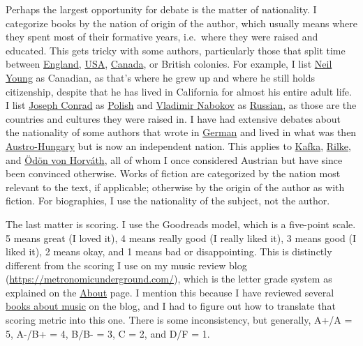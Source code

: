 \documentclass[12pt]{article}
\begin{document}
Perhaps the largest opportunity for debate is the matter of nationality. I categorize books by the nation of origin of the author, which usually means where they spent most of their formative years, i.e.\ where they were raised and educated. This gets tricky with some authors, particularly those that split time between \hyperref[nation:England]{England}, \hyperref[nation:USA]{USA}, \hyperref[nation:Canada]{Canada}, or British colonies. For example, I list \hyperref[sec:Neil Young]{Neil Young} as Canadian, as that's where he grew up and where he still holds citizenship, despite that he has lived in California for almost his entire adult life. I list \hyperref[sec:Joseph Conrad]{Joseph Conrad} as \hyperref[nation:Poland]{Polish} and \hyperref[sec:Vladimir Nabokov]{Vladimir Nabokov} as \hyperref[nation:Russia]{Russian}, as those are the countries and cultures they were raised in. I have had extensive debates about the nationality of some authors that wrote in \hyperref[lang:German]{German} and lived in what was then \hyperref[nation:Austria]{Austro-Hungary} but is now an independent nation. This applies to \hyperref[sec:Franz Kafka]{Kafka}, \hyperref[sec:Rainer Maria Rilke]{Rilke}, and \hyperref[sec:Oedoen von Horvath]{Ödön von Horváth}, all of whom I once considered Austrian but have since been convinced otherwise. Works of fiction are categorized by the nation most relevant to the text, if applicable; otherwise by the origin of the author as with fiction. For biographies, I use the nationality of the subject, not the author.

The last matter is scoring. I use the Goodreads model, which is a five-point scale. 5 means great (I loved it), 4 means really good (I really liked it), 3 means good (I liked it), 2 means okay, and 1 means bad or disappointing. This is distinctly different from the scoring I use on my music review blog (\url{https://metronomicunderground.com/}), which is the letter grade system as explained on the \href{https://metronomicunderground.com/p/about.html}{About} page. I mention this because I have reviewed several \href{https://metronomicunderground.com/search/label/book%20review}{books about music} on the blog, and I had to figure out how to translate that scoring metric into this one. There is some inconsistency, but generally, A+/A = 5, A-/B+ = 4, B/B- = 3, C = 2, and D/F = 1.


\tableofcontents \label{sec:toc}
\end{document}
